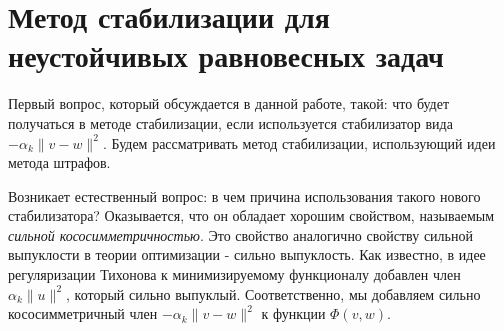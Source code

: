 \section{Метод стабилизации для неустойчивых равновесных задач}
Первый вопрос, который обсуждается в данной работе, такой: что будет получаться в методе стабилизации, если используется стабилизатор вида $-\alpha_k\|v-w\|^2$. Будем рассматривать метод стабилизации, использующий идеи метода штрафов.

Возникает естественный вопрос: в чем причина использования такого нового стабилизатора? Оказывается, что он обладает хорошим свойством, называемым \textit{сильной кососимметричностью}. Это свойство аналогично свойству сильной выпуклости в теории оптимизации - сильно выпуклость. Как известно, в идее регуляризации Тихонова к минимизируемому функционалу добавлен член $\alpha_k\|u\|^2$, который сильно выпуклый. Соответственно, мы добавляем сильно кососимметричный член $-\alpha_k\|v-w\|^2$ к функции $\Phi(v,w)$.

